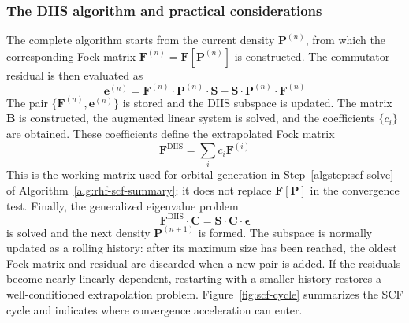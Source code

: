 \documentclass[11pt,a4paper,titlepage]{article}
\numberwithin{equation}{section}
\newcommand{\be}{\boldsymbol{e}}
\newcommand{\bB}{\boldsymbol{B}}
\newcommand{\bC}{\boldsymbol{C}}
\newcommand{\bF}{\boldsymbol{F}}
\newcommand{\bP}{\boldsymbol{P}}
\newcommand{\bS}{\boldsymbol{S}}
\newcommand{\beps}{\boldsymbol{\epsilon}}
\begin{document}
\subsubsection{The DIIS algorithm and practical considerations}

The complete algorithm starts from the current density $\bP^{(n)}$, from
which the corresponding Fock matrix
$\bF^{(n)}=\bF[\bP^{(n)}]$ is constructed. The commutator residual is then
evaluated as
\begin{equation}
  \be^{(n)}
  =\bF^{(n)}\cdot\bP^{(n)}\cdot\bS
  -\bS\cdot\bP^{(n)}\cdot\bF^{(n)}
\end{equation}
The pair $\{\bF^{(n)},\be^{(n)}\}$ is stored and the DIIS subspace is
updated. The matrix $\bB$ is constructed, the augmented linear system is
solved, and the coefficients $\{c_i\}$ are obtained. These coefficients
define the extrapolated Fock matrix
\begin{equation}
  \bF^\text{DIIS}=\sum_i c_i\bF^{(i)}
\end{equation}
This is the working matrix used for orbital generation in
Step~\ref{algstep:scf-solve} of Algorithm~\ref{alg:rhf-scf-summary};
it does not replace $\bF[\bP]$ in the convergence test.
Finally, the generalized eigenvalue problem
\begin{equation}
  \bF^\text{DIIS}\cdot\bC
  =\bS\cdot\bC\cdot\beps
\end{equation}
is solved and the next density $\bP^{(n+1)}$ is formed.
The subspace is normally updated as a rolling history: after its maximum size
has been reached, the oldest Fock matrix and residual are discarded when a new
pair is added. If the residuals become nearly linearly dependent, restarting
with a smaller history restores a well-conditioned extrapolation problem.
Figure~\ref{fig:scf-cycle} summarizes the SCF cycle and indicates where
convergence acceleration can enter.
\end{document}

